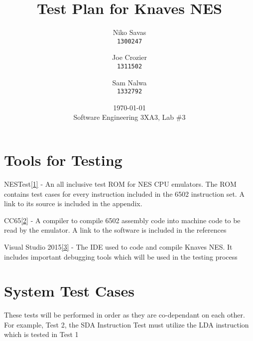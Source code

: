 \documentclass[12pt]{article}
\begin{document}
\title{Test Plan for Knaves NES}
\date{\today\\
	{\medskip\small Software Engineering 3XA3, Lab \#3}
}
\author{Niko Savas\\
	\texttt{1300247}
	\and
	Joe Crozier\\
	\texttt{1311502}
	\and
	Sam Nalwa\\
	\texttt{1332792}
}

\maketitle
\clearpage

\tableofcontents

\listoffigures

\listoftables

\clearpage

\section{Tools for Testing}
\setlength{\parindent}{0cm}
	NESTest\hyperlink{refs}{[1]} - An all inclusive test ROM for NES CPU emulators. The ROM contains test cases for every instruction included in the 6502 instruction set. A link to its source is included in the appendix.

	CC65\hyperlink{refs}{[2]} - A compiler to compile 6502 assembly code into machine code to be read by the emulator. A link to the software is included in the references

	Visual Studio 2015\hyperlink{refs}{[3]} - The IDE used to code and compile Knaves NES. It includes important debugging tools which will be used in the testing process
\section{System Test Cases}
	These tests will be performed in order as they are co-dependant on each other. For example, Test 2, the SDA Instruction Test must utilize the LDA instruction which is tested in Test 1
\end{document}

